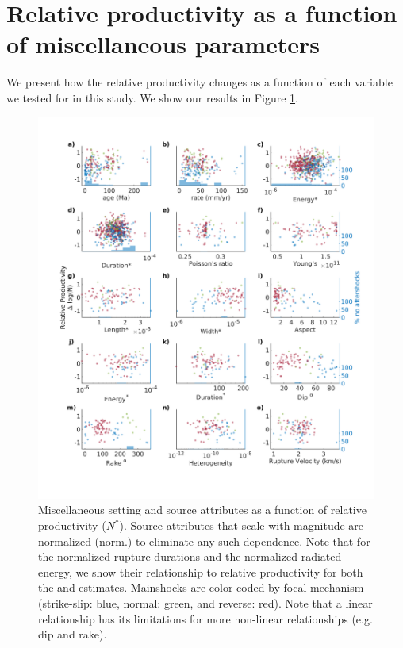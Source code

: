 \documentclass[draft]{agujournal}
\begin{document}

    
\section{Relative productivity as a function of miscellaneous parameters}\label{sec:relative}

We present how the relative productivity changes as a function of each variable we tested for in this study. We show our results in Figure \ref{fig:misc}.

\begin{figure}[H]
\centering
\includegraphics{figures/misc.png}
\caption{Miscellaneous setting and source attributes as a function of relative productivity ($N^*$). Source attributes that scale with magnitude are normalized (norm.) to eliminate any such dependence. Note that for the normalized rupture durations and the normalized radiated energy, we show their relationship to relative productivity for both the \citet{Convers2011GlobalMid2010} and \citet{Hayes2017} estimates. Mainshocks are color-coded by focal mechanism (strike-slip: blue, normal: green, and reverse: red). Note that a linear relationship has its limitations for more non-linear relationships (e.g. dip and rake).}
\label{fig:misc}
\end{figure}   
\end{document}
